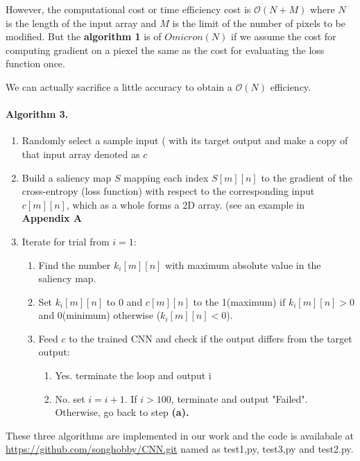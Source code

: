 \documentclass{article}
\begin{document}
However, the computational cost or time efficiency cost is $\mathcal{O}(N+M)$ where $N$ is the length of the input array and $M$ is the limit of the number of pixels to be modified. 
But the \textbf{algorithm 1} is of $Omicron(N)$ if we assume the cost for computing gradient on a piexel the same as the cost for evaluating the loss function once.

We can actually sacrifice a little accuracy to obtain a $\mathcal{O}(N)$ efficiency.

\paragraph{Algorithm 3.}
\begin{enumerate}
\item Randomly select a sample input ( with its target output and make a copy of that input array denoted as $c$

\item Build a saliency map $S$ mapping each index $S[m][n]$ to the gradient of the cross-entropy (loss function) with respect to the corresponding input$c[m][n]$, which as a whole forms a 2D array. (see an example in \textbf{Appendix A}

\item Iterate for trial from $i=1$:

\begin{enumerate}
	\item Find the number $k_i[m][n]$ with maximum absolute value in the saliency map.

	\item Set $k_i[m][n]$ to 0 and $c[m][n]$ to the 1(maximum) if $k_i[m][n] > 0$ and 0(minimum) otherwise ($k_i[m][n] < 0$).

	\item Feed $c$ to the trained CNN and check if the output differs from the target output:
		\begin{enumerate}
			\item Yes. terminate the loop and output i
			\item No. set $i=i+1$. If $i > 100$, terminate and output "Failed". Otherwise, go back to step \textbf{(a).}
		\end{enumerate}
\end{enumerate}
\end{enumerate}

These three algorithms are implemented in our work and the code is availabale at \url{https://github.com/songhobby/CNN.git} named as test1,py, test3,py and test2.py.
\end{document}
